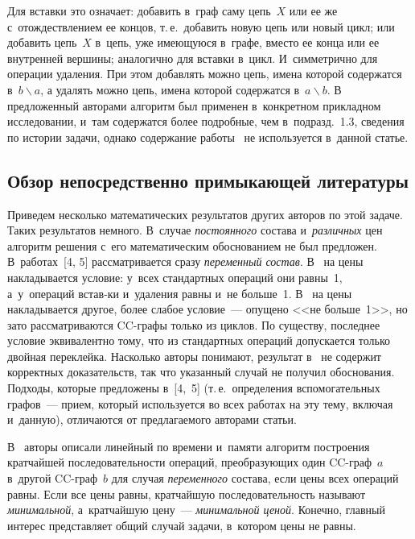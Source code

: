 \begin{multicols}{2}
  
  Для вставки это означает: добавить в~граф саму цепь~$X$ или ее же 
с~отождествлением ее концов, т.\,е.\ добавить новую цепь или новый цикл; или 
добавить цепь~$X$ в~цепь, уже имеющуюся в~графе, вместо ее конца или ее 
внутренней вершины; аналогично для вставки в~цикл. И~симметрично для 
операции удаления. При этом добавлять можно цепь, имена которой содержатся 
в~$b\backslash a$, а удалять можно цепь, имена которой содержатся 
в~$a\backslash b$. В~\cite{3-gor} предложенный авторами алгоритм был 
применен в~конкретном прикладном исследовании, и~там содержатся более 
подробные, чем в~подразд.~1.3, сведения по истории задачи, однако содержание 
работы~\cite{3-gor} не используется в~данной статье.
  
  \subsection{Обзор непосредственно примыкающей литературы}
  
  Приведем несколько математических результатов других авторов по этой 
задаче. Таких результатов немного. В~случае \textit{постоянного} состава 
и~\textit{различных} цен алгоритм решения с~его математическим 
обосно\-ва\-ни\-ем не был предложен. В~работах~[4, 5] рассматривается сразу 
\textit{переменный состав}. В~\cite{4-gor} на цены накладывается условие: 
у~всех стандартных операций они равны~1, а~у~операций встав-\linebreak ки и~удаления 
равны и~не больше~1. В~\cite{5-gor} на цены накладывается другое, более 
слабое условие~--- опущено <<не больше~1>>, но зато рассматриваются  
CC-гра\-фы только из циклов. По существу, последнее условие эквивалентно 
тому, что из стандартных операций допускается только двойная переклейка. 
Насколько авторы понимают, результат в~\cite{4-gor} не содержит корректных 
доказательств, так что указанный случай не получил обоснования. Подходы, 
которые предложены в~[4,~5] (т.\,е.\ определения вспомогательных графов~--- 
прием, который используется во всех работах на эту тему, включая и~данную), 
отличаются от предлагаемого авторами статьи.
{

} 
  
  В~\cite{2-gor} авторы описали линейный по времени и~памяти алгоритм 
построения кратчайшей последовательности операций, преобразующих один 
CC-граф~$a$ в~другой CC-граф~$b$ для случая \textit{переменного} состава, 
если цены всех операций равны. Если все цены равны, кратчайшую 
последовательность называют \textit{минимальной}, а~кратчайшую цену~--- 
\textit{минимальной ценой}. Конечно, главный интерес представляет общий 
случай задачи, в~котором цены не равны. 


\end{multicols}
